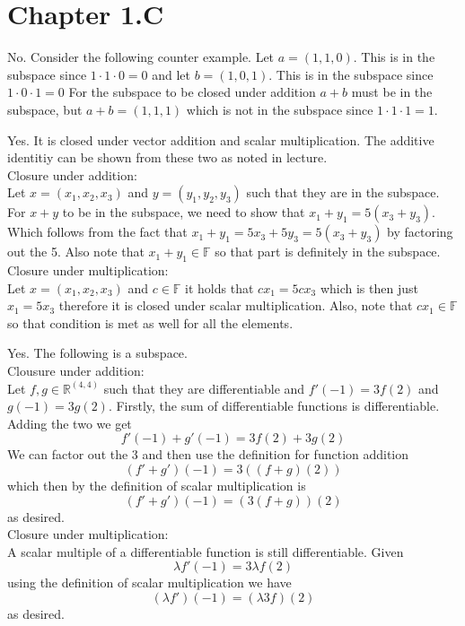 \documentclass[10pt, twocolumn]{article}
\newcommand{\R}{\mathbb{R}}
\begin{document}
\section{Chapter 1.C}
\begin{q}[Problem 1(c)]
    No. Consider the following counter example. 
    Let $ a = (1, 1, 0) $. This is in the subspace since $ 1 \cdot 1 \cdot 0 = 0 $ 
    and let  $ b = (1, 0, 1) $. This is in the subspace since $ 1 \cdot 0 \cdot 1 = 0 $ 
    For the subspace to be closed under addition $ a + b $ must be in the subspace, 
    but $ a + b = (1, 1, 1) $ which is not in the subspace since $ 1 \cdot 1 \cdot 1 = 1 $.
\end{q}
\begin{q}[Problem 1(d)]
    Yes. It is closed under vector addition and scalar multiplication. The additive identitiy can be shown from these two as noted in lecture.\\
    Closure under addition: \\
    Let $ x = (x_1, x_2, x_3) $ and $ y = (y_1, y_2, y_3) $ such that they are in the subspace.
    For $ x + y $ to be in the subspace, we need to show that $ x_1 + y_1 = 5(x_3 + y_3) $. 
    Which follows from the fact that $ x_1 + y_1 = 5x_3 + 5y_3 = 5(x_3 + y_3) $  by factoring out the 5. 
    Also note that $ x_1 + y_1 \in \mathbb{F} $ so that part is definitely in the subspace.
    Closure under multiplication: \\
    Let $ x = (x_1, x_2, x_3) $ and $ c \in \mathbb{F} $ it holds that $ c x_1 = 5c x_3 $ which is then just $ x_1 = 5 x_3 $ 
    therefore it is closed under scalar multiplication. Also, note that $ cx_1 \in \mathbb{F} $ so that condition is met as well for all the elements.
\end{q}
\begin{q}[Problem 3]
    Yes. The following is a subspace. \\
    Clousure under addition: \\
    Let $ f, g \in \R^{(4, 4)} $ such that they are differentiable and $ f'(-1) = 3f(2) $ and $ g(-1) = 3g(2) $. 
    Firstly, the sum of differentiable functions is differentiable.
    Adding the two we get $$ f'(-1) + g'(-1) = 3f(2) + 3g(2) $$ 
    We can factor out the 3 and then use the definition for function addition 
    $$ (f'+ g')(-1) = 3((f+g)(2)) $$ which then by the definition of scalar multiplication is 
    $$ (f'+ g')(-1) = (3(f+g))(2) $$ as desired. \\
    Closure under multiplication: \\
    A scalar multiple of a differentiable function is still differentiable. 
    Given
    $$ \lambda f'(-1) = 3 \lambda f(2) $$
    using the definition of scalar multiplication we have
    $$ (\lambda f')(-1) = (\lambda 3 f)(2) $$
    as desired.
\end{q}
\end{document}
